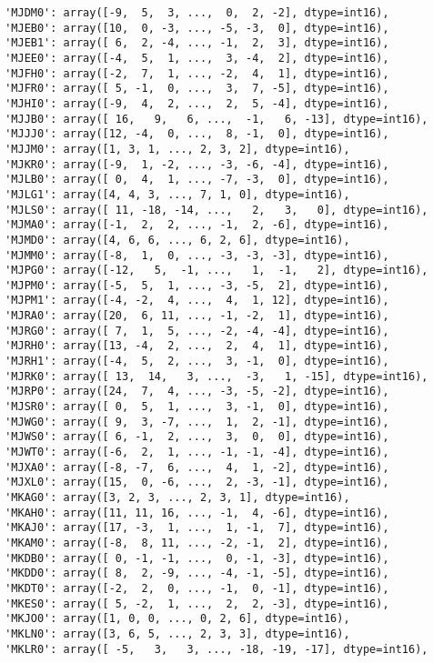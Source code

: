 \documentclass[11pt]{article}
\begin{document}
\begin{verbatim}
 'MJDM0': array([-9,  5,  3, ...,  0,  2, -2], dtype=int16),
 'MJEB0': array([10,  0, -3, ..., -5, -3,  0], dtype=int16),
 'MJEB1': array([ 6,  2, -4, ..., -1,  2,  3], dtype=int16),
 'MJEE0': array([-4,  5,  1, ...,  3, -4,  2], dtype=int16),
 'MJFH0': array([-2,  7,  1, ..., -2,  4,  1], dtype=int16),
 'MJFR0': array([ 5, -1,  0, ...,  3,  7, -5], dtype=int16),
 'MJHI0': array([-9,  4,  2, ...,  2,  5, -4], dtype=int16),
 'MJJB0': array([ 16,   9,   6, ...,  -1,   6, -13], dtype=int16),
 'MJJJ0': array([12, -4,  0, ...,  8, -1,  0], dtype=int16),
 'MJJM0': array([1, 3, 1, ..., 2, 3, 2], dtype=int16),
 'MJKR0': array([-9,  1, -2, ..., -3, -6, -4], dtype=int16),
 'MJLB0': array([ 0,  4,  1, ..., -7, -3,  0], dtype=int16),
 'MJLG1': array([4, 4, 3, ..., 7, 1, 0], dtype=int16),
 'MJLS0': array([ 11, -18, -14, ...,   2,   3,   0], dtype=int16),
 'MJMA0': array([-1,  2,  2, ..., -1,  2, -6], dtype=int16),
 'MJMD0': array([4, 6, 6, ..., 6, 2, 6], dtype=int16),
 'MJMM0': array([-8,  1,  0, ..., -3, -3, -3], dtype=int16),
 'MJPG0': array([-12,   5,  -1, ...,   1,  -1,   2], dtype=int16),
 'MJPM0': array([-5,  5,  1, ..., -3, -5,  2], dtype=int16),
 'MJPM1': array([-4, -2,  4, ...,  4,  1, 12], dtype=int16),
 'MJRA0': array([20,  6, 11, ..., -1, -2,  1], dtype=int16),
 'MJRG0': array([ 7,  1,  5, ..., -2, -4, -4], dtype=int16),
 'MJRH0': array([13, -4,  2, ...,  2,  4,  1], dtype=int16),
 'MJRH1': array([-4,  5,  2, ...,  3, -1,  0], dtype=int16),
 'MJRK0': array([ 13,  14,   3, ...,  -3,   1, -15], dtype=int16),
 'MJRP0': array([24,  7,  4, ..., -3, -5, -2], dtype=int16),
 'MJSR0': array([ 0,  5,  1, ...,  3, -1,  0], dtype=int16),
 'MJWG0': array([ 9,  3, -7, ...,  1,  2, -1], dtype=int16),
 'MJWS0': array([ 6, -1,  2, ...,  3,  0,  0], dtype=int16),
 'MJWT0': array([-6,  2,  1, ..., -1, -1, -4], dtype=int16),
 'MJXA0': array([-8, -7,  6, ...,  4,  1, -2], dtype=int16),
 'MJXL0': array([15,  0, -6, ...,  2, -3, -1], dtype=int16),
 'MKAG0': array([3, 2, 3, ..., 2, 3, 1], dtype=int16),
 'MKAH0': array([11, 11, 16, ..., -1,  4, -6], dtype=int16),
 'MKAJ0': array([17, -3,  1, ...,  1, -1,  7], dtype=int16),
 'MKAM0': array([-8,  8, 11, ..., -2, -1,  2], dtype=int16),
 'MKDB0': array([ 0, -1, -1, ...,  0, -1, -3], dtype=int16),
 'MKDD0': array([ 8,  2, -9, ..., -4, -1, -5], dtype=int16),
 'MKDT0': array([-2,  2,  0, ..., -1,  0, -1], dtype=int16),
 'MKES0': array([ 5, -2,  1, ...,  2,  2, -3], dtype=int16),
 'MKJO0': array([1, 0, 0, ..., 0, 2, 6], dtype=int16),
 'MKLN0': array([3, 6, 5, ..., 2, 3, 3], dtype=int16),
 'MKLR0': array([ -5,   3,   3, ..., -18, -19, -17], dtype=int16),

\end{verbatim}
\end{document}
